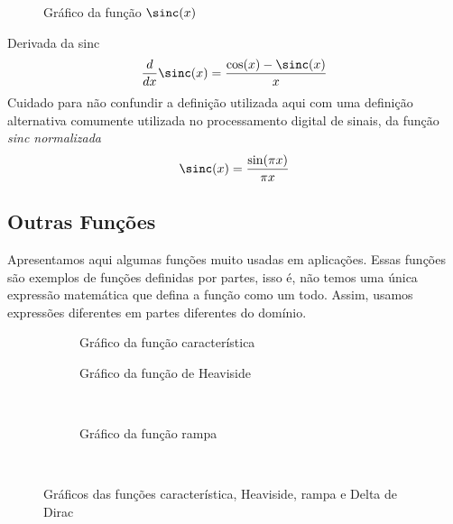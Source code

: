 \begin{figure}
  \centering
  
  \caption{Gráfico da função $\sinc(x)$}
  \label{fig:functions_sinc}
\end{figure}

Derivada da sinc
\[
  \frac{d}{dx} \sinc(x) = \frac{\cos(x)-\sinc(x)}{x}
\]
Cuidado para não confundir a definição utilizada aqui com
uma definição alternativa comumente utilizada no processamento digital de sinais,
da função \emph{sinc normalizada}
\[
  \sinc(x) = \frac{\sin(\pi x)}{\pi x}
\]

\subsection*{Outras Funções}

Apresentamos aqui algumas funções muito usadas em aplicações.
Essas funções são exemplos de funções definidas por partes, isso é, não temos
uma única expressão matemática que defina a função como um todo.
Assim, usamos expressões diferentes em partes diferentes do domínio.

\begin{figure}
  \centering
  \begin{subfigure}[b]{0.5\linewidth}
    \centering
    
    \caption{Gráfico da função característica}
    \label{fig:functions_carac}
  \end{subfigure}%
  \begin{subfigure}[b]{0.5\linewidth}
    \centering
    
    \caption{Gráfico da função de Heaviside}
    \label{fig:functions_heaviside}
  \end{subfigure}\\[0.5\baselineskip]
  \begin{subfigure}[b]{0.5\linewidth}
    \centering
    
    \caption{Gráfico da função rampa}
    \label{fig:functions_rampa}
  \end{subfigure}\\[0.5\baselineskip]
  \caption{Gráficos das funções característica, Heaviside, rampa e Delta de Dirac}
  \label{fig:functions_other}
\end{figure}

